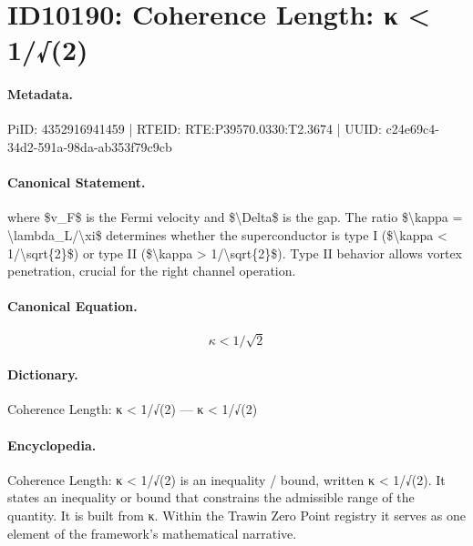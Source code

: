 \section*{ID10190: Coherence Length: κ < 1/√(2)}
\paragraph{Metadata.}
PiID: 4352916941459 | RTEID: RTE:P39570.0330:T2.3674 | UUID: c24e69c4-34d2-591a-98da-ab353f79c9cb

\paragraph{Canonical Statement.}
where \$v\_F\$ is the Fermi velocity and \$\textbackslash{}Delta\$ is the gap. The ratio \$\textbackslash{}kappa = \textbackslash{}lambda\_L/\textbackslash{}xi\$ determines whether the superconductor is type I (\$\textbackslash{}kappa < 1/\textbackslash{}sqrt\{2\}\$) or type II (\$\textbackslash{}kappa > 1/\textbackslash{}sqrt\{2\}\$). Type II behavior allows vortex penetration, crucial for the right channel operation.

\paragraph{Canonical Equation.}
\[
\kappa < 1/\sqrt{2}
\]

\paragraph{Dictionary.}
Coherence Length: κ < 1/√(2) — κ < 1/√(2)

\paragraph{Encyclopedia.}
Coherence Length: κ < 1/√(2) is an inequality / bound, written κ < 1/√(2). It states an inequality or bound that constrains the admissible range of the quantity. It is built from κ. Within the Trawin Zero Point registry it serves as one element of the framework's mathematical narrative.

